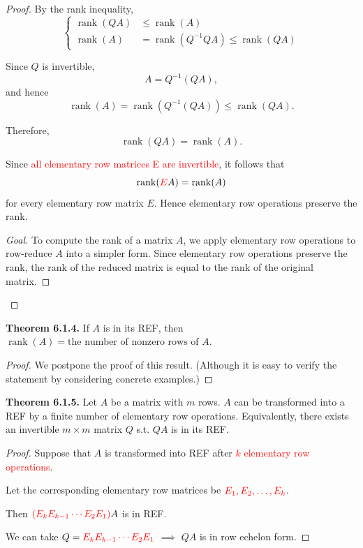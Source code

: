 \documentclass[12pt]{article}
\newenvironment{Goal}
{\begin{proof}[Goal]}
{\end{proof}}
\begin{document}
\begin{proof}
By the rank inequality,
\[
\left\{
\begin{aligned}
\operatorname{rank}(QA) &\le \operatorname{rank}(A)\\
\operatorname{rank}(A) &= \operatorname{rank}(Q^{-1}QA) \le \operatorname{rank}(QA)
\end{aligned}
\right.  
\]

Since $Q$ is invertible,
\[
A=Q^{-1}(QA),
\]
and hence
\[
\operatorname{rank}(A)=\operatorname{rank}\!\left(Q^{-1}(QA)\right)\le \operatorname{rank}(QA).
\]

Therefore,
\[
\operatorname{rank}(QA)=\operatorname{rank}(A).
\]

Since \textcolor{red}{all elementary row matrices E are invertible}, it follows that
\[
\operatorname{rank}(\textcolor{red}{E}A)=\operatorname{rank}(A)
\]
for every elementary row matrix $E$. Hence elementary row operations preserve the rank.

\begin{Goal}
To compute the rank of a matrix $A$, we apply elementary row operations
to row-reduce $A$ into a simpler form. Since elementary row operations
preserve the rank, the rank of the reduced matrix is equal to the rank
of the original matrix.
\end{Goal}

\end{proof}

\textbf{Theorem 6.1.4.}
If $A$ is in its REF, then $\operatorname{rank}(A)=\text{the number of nonzero rows of }A$.

\begin{proof}
We postpone the proof of this result. (Although it is easy to verify
the statement by considering concrete examples.)
\end{proof}

\textbf{Theorem 6.1.5.}
Let $A$ be a matrix with $m$ rows. $A$ can be transformed into a REF by a finite number of elementary row operations.
Equivalently, there exists an invertible $m\times m$ matrix $Q$ s.t. $QA$ is in its REF.

\begin{proof}
Suppose that $A$ is transformed into REF after \textcolor{red}{$k$
elementary row operations}. 

Let the corresponding elementary row matrices be $\textcolor{red}{E_1,E_2,\ldots,E_k}$.

Then $\textcolor{red}{(E_kE_{k-1}\cdots E_2E_1)}A$ is in REF.

We can take $Q=\textcolor{red}{E_kE_{k-1}\cdots E_2E_1}$ $\implies$ $QA$ is in row echelon form.
\end{proof}
\end{document}
